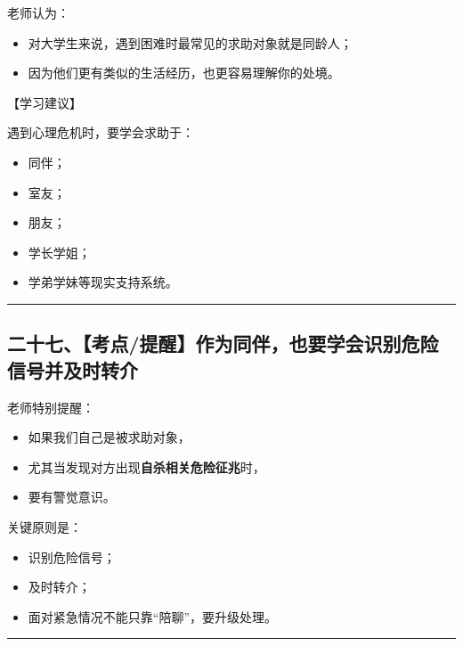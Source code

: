 \documentclass[
  chinese,
  9pt,
  a4paper,
]{ctexart}
\providecommand{\tightlist}{%
  \setlength{\itemsep}{0pt}\setlength{\parskip}{0pt}}
\begin{document}
老师认为：

\begin{itemize}
\tightlist
\item
  对大学生来说，遇到困难时最常见的求助对象就是同龄人；
\item
  因为他们更有类似的生活经历，也更容易理解你的处境。
\end{itemize}

【学习建议】

遇到心理危机时，要学会求助于：

\begin{itemize}
\tightlist
\item
  同伴；
\item
  室友；
\item
  朋友；
\item
  学长学姐；
\item
  学弟学妹等现实支持系统。
\end{itemize}

\begin{center}\rule{0.5\linewidth}{0.5pt}\end{center}

\subsection{二十七、【考点/提醒】作为同伴，也要学会识别危险信号并及时转介}\label{ux4e8cux5341ux4e03ux8003ux70b9ux63d0ux9192ux4f5cux4e3aux540cux4f34ux4e5fux8981ux5b66ux4f1aux8bc6ux522bux5371ux9669ux4fe1ux53f7ux5e76ux53caux65f6ux8f6cux4ecb}

老师特别提醒：

\begin{itemize}
\tightlist
\item
  如果我们自己是被求助对象，
\item
  尤其当发现对方出现\textbf{自杀相关危险征兆}时，
\item
  要有警觉意识。
\end{itemize}

关键原则是：

\begin{itemize}
\tightlist
\item
  识别危险信号；
\item
  及时转介；
\item
  面对紧急情况不能只靠``陪聊''，要升级处理。
\end{itemize}

\begin{center}\rule{0.5\linewidth}{0.5pt}\end{center}
\end{document}
